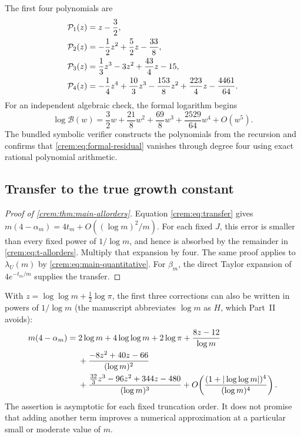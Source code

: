 \documentclass[11pt,a4paper]{article}
\theoremstyle{definition}\newaliascnt{definition}{theorem}
\theoremstyle{remark}\newaliascnt{remark}{theorem}
\newcommand{\Bformal}{\mathcal B}%
\begin{document}
The first four polynomials are
\begin{align}
 \mathcal P_1(z)&=z-\frac32,\notag\\
 \mathcal P_2(z)&=-\frac12z^2+\frac52z-\frac{33}{8},\notag\\
 \mathcal P_3(z)&=\frac13z^3-3z^2+\frac{43}{4}z-15,\notag\\
 \mathcal P_4(z)&=-\frac14z^4+\frac{10}{3}z^3-\frac{153}{8}z^2
              +\frac{223}{4}z-\frac{4461}{64}.
 \label{crem:eq:P-four}
\end{align}
For an independent algebraic check, the formal logarithm begins
\begin{equation}
 \log\Bformal(w)=\frac32w+\frac{21}{8}w^2
                 +\frac{69}{8}w^3+\frac{2529}{64}w^4+O(w^5).
 \label{crem:eq:logB}
\end{equation}
The bundled symbolic verifier constructs the polynomials from the recursion
and confirms that \eqref{crem:eq:formal-residual} vanishes through degree
four using exact rational polynomial arithmetic.

\subsection{Transfer to the true growth constant}
\begin{proof}[Proof of \cref{crem:thm:main-allorders}]
Equation \eqref{crem:eq:transfer} gives
$m(4-\alpha_m)=4t_m+O((\log m)^2/m)$. For each fixed $J$, this error is
smaller than every fixed power of $1/\log m$, and hence is absorbed by the
remainder in \eqref{crem:eq:t-allorders}. Multiply that expansion by four.
The same proof applies to $\lambda_U(m)$ by
\eqref{crem:eq:main-quantitative}. For $\beta_m$, the direct Taylor
expansion of $4e^{-t_m/m}$ supplies the transfer.
\end{proof}

With $z=\log\log m+\frac12\log\pi$, the first three corrections can also be
written in powers of $1/\log m$ (the manuscript abbreviates $\log m$ as $H$,
which Part~II avoids):
\begin{align}
 m(4-\alpha_m)
 ={}&2\log m+4\log\log m+2\log\pi
       +\frac{8z-12}{\log m}\notag\\
 &+\frac{-8z^2+40z-66}{(\log m)^2}\notag\\
 &+\frac{\frac{32}{3}z^3-96z^2+344z-480}{(\log m)^3}
       +O\!\left(\frac{(1+|\log\log m|)^4}{(\log m)^4}\right).
 \label{crem:eq:explicit-expansion}
\end{align}
The assertion is asymptotic for each fixed truncation order. It does not
promise that adding another term improves a numerical approximation at a
particular small or moderate value of $m$.
\end{document}
